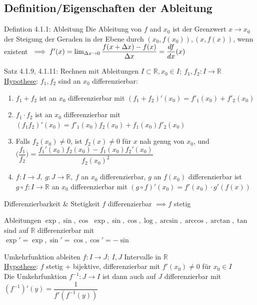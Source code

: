 \documentclass[a4paper,10pt]{article}
\begin{document}
\subsection{Definition/Eigenschaften der Ableitung}
\begin{defbox}
    {Defintion 4.1.1: Ableitung}
    Die Ableitung von $f$ and $x_0$ ist der Grenzwert $x\longrightarrow x_0$ der Steigung der Geraden in der Ebene durch $(x_0,f(x_0)),(x,f(x))$, wenn existent 
    $\\\implies f'(x)=\lim_{\Delta x\to 0}\dfrac{f(x+\Delta x)-f(x)}{\Delta x}=\dfrac{df}{dx}(x)$
\end{defbox}
\begin{tbox}
    {Satz 4.1.9, 4.1.11: Rechnen mit Ableitungen}
    $I\subset \mathbb R, x_0 \in I; \ f_1, f_2: I \longrightarrow \mathbb R$
    \\ \underline{Hypothese}: $f_1,f_2$ sind an $x_0$ differenzierbar:
    \begin{enumerate}
        \item $f_1+f_2$ ist an $x_0$ differenzierbar mit $(f_1+f_2)'(x_0)=f'_1(x_0)+f'_2(x_0)$
        \item $f_1\cdot f_2$ ist an $x_0$ differenzierbar mit $(f_1f_2)'(x_0)=f'_1(x_0)f_2(x_0)+f_1(x_0)f'_2(x_0)$
        \item Falls $f_2(x_0)\neq 0$, ist $f_2(x)\neq 0$ für $x$ nah genug von $x_0$, und \\$\bigg(\dfrac{f_1}{f_2}\bigg)=\dfrac{f_1'(x_0)f_2(x_0)-f_1(x_0)f_2'(x_0)}{f_2(x_0)^2}$
        \item $f:I\longrightarrow J,\ g: J \longrightarrow \mathbb R,\ f$ an $x_0$ differenzierbar, $g$ an $f(x_0)$ differenzierbar ist $g\circ f: I\longrightarrow \mathbb R$ an $x_0$ differenzierbar mit $(g\circ f)'(x_0)=f'(x_0)\cdot g'(f(x))$
    \end{enumerate}
\end{tbox}
\begin{bembox}
    {Differenzierbarkeit \& Stetigkeit}
    $f$ differenzierbar $\implies f$ stetig
\end{bembox}
\begin{tbox}
    {Ableitungen $\exp, \sin, \cos$}
    $\exp, \sin, \cos, \log, \arcsin, \arccos, \arctan, \tan$ sind auf $\mathbb R$ differenzierbar mit 
    \\ $\exp'=\exp, \sin'=\cos, \cos'=-\sin$
\end{tbox}
\begin{tbox}
    {Umkehrfunktion ableiten}
        $f:I\longrightarrow J; \ I,J$ Intervalle in $\mathbb R$
        \\ \underline{Hypothese}: $f$ stetig + bijektive, differenzierbar mit $f'(x_0)\neq 0$ für $x_0\in I$
        \\ Die Umkehrfunktion $f^{-1}:J\longrightarrow I$ ist dann auch auf $J$ differenzierbar mit $(f^{-1})'(y)=\dfrac{1}{f'(f^{-1}(y))}$
\end{tbox}
\end{document}
